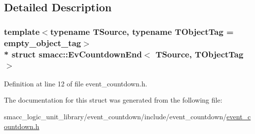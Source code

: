 \subsection{Detailed Description}
\subsubsection*{template$<$typename T\+Source, typename T\+Object\+Tag = empty\+\_\+object\+\_\+tag$>$\\*
struct smacc\+::\+Ev\+Countdown\+End$<$ T\+Source, T\+Object\+Tag $>$}



Definition at line 12 of file event\+\_\+countdown.\+h.



The documentation for this struct was generated from the following file\+:\begin{DoxyCompactItemize}
\item 
smacc\+\_\+logic\+\_\+unit\+\_\+library/event\+\_\+countdown/include/event\+\_\+countdown/\hyperlink{event__countdown_8h}{event\+\_\+countdown.\+h}\end{DoxyCompactItemize}
